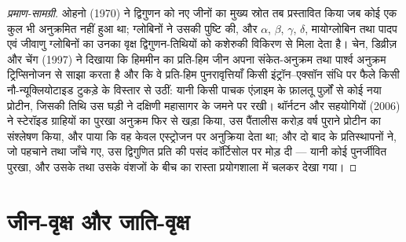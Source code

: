 \begin{proof}[प्रमाण-सामग्री]
ओहनो (1970) ने द्विगुणन को नए जीनों का मुख्य स्रोत तब प्रस्तावित किया
जब कोई एक कुल भी अनुक्रमित नहीं हुआ था; ग्लोबिनों ने उसकी पुष्टि की, और
$\alpha$, $\beta$, $\gamma$, $\delta$, मायोग्लोबिन तथा पादप एवं जीवाणु
ग्लोबिनों का उनका वृक्ष द्विगुणन-तिथियों को कशेरुकी विकिरण से मिला
देता है। चेन, डिव्रीज़ और चेंग (1997) ने दिखाया कि हिममीन का प्रति-हिम
जीन अपना संकेत-अनुक्रम तथा पार्श्व अनुक्रम ट्रिप्सिनोजन से साझा करता है
और कि वे प्रति-हिम पुनरावृत्तियाँ किसी इंट्रॉन--एक्सॉन संधि पर फैले
किसी नौ-न्यूक्लियोटाइड टुकड़े के विस्तार से उठीं: यानी किसी पाचक
एंज़ाइम के फ़ालतू पुर्ज़ों से कोई नया प्रोटीन, जिसकी तिथि उस घड़ी ने
दक्षिणी महासागर के जमने पर रखी। थॉर्नटन और सहयोगियों (2006) ने
स्टेरॉइड ग्राहियों का पुरखा अनुक्रम फिर से खड़ा किया, उस पैंतालीस
करोड़ वर्ष पुराने प्रोटीन का संश्लेषण किया,
और पाया कि वह केवल एस्ट्रोजन पर अनुक्रिया देता था; और दो बाद के
प्रतिस्थापनों ने, जो पहचाने तथा जाँचे गए, उस द्विगुणित प्रति की पसंद
कॉर्टिसोल पर मोड़ दी --- यानी कोई पुनर्जीवित पुरखा, और उसके तथा उसके
वंशजों के बीच का रास्ता प्रयोगशाला में चलकर देखा गया।
\end{proof}

\section{जीन-वृक्ष और जाति-वृक्ष}

